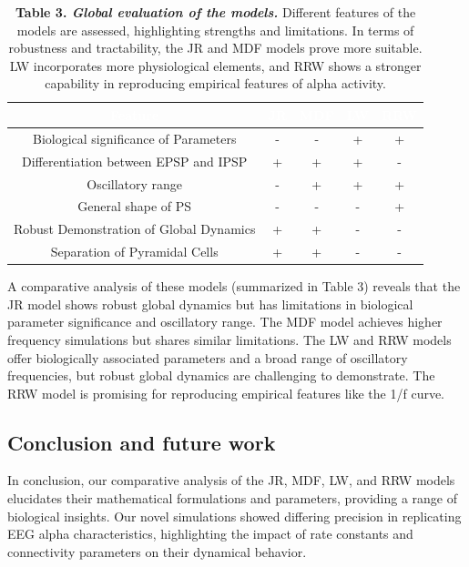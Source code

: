 \documentclass[12pt,twoside]{article}
\begin{document}
\begin{table}
    \scriptsize
    \centering
    \begin{tabular}{ccccc}
        \rowcolor{black} 
        \textcolor{white}{Feature} & \textcolor{white}{JR} & \textcolor{white}{MDF} & \textcolor{white}{LW} & \textcolor{white}{RRW} \\
        \hline
        Biological significance of Parameters & - & - & + & + \\
        Differentiation between EPSP and IPSP & + & + & + & - \\
        Oscillatory range & - & + & + & + \\
        General shape of PS & - & - & - & + \\
        Robust Demonstration of Global Dynamics & + & + & - & - \\
        Separation of Pyramidal Cells & + & + & - & -
    \end{tabular}
    \caption*{\textbf{Table 3. \textit{Global evaluation of the models.}} Different features of the models are assessed, highlighting strengths and limitations. In terms of robustness and tractability, the JR and MDF models prove more suitable. LW incorporates more physiological elements, and RRW shows a stronger capability in reproducing empirical features of alpha activity.} 
    \label{tab:global_eval}
    \vspace{-0.5cm}
\end{table}

A comparative analysis of these models (summarized in Table 3) reveals that the JR model shows robust global dynamics but has limitations in biological parameter significance and oscillatory range. The MDF model achieves higher frequency simulations but shares similar limitations. The LW and RRW models offer biologically associated parameters and a broad range of oscillatory frequencies, but robust global dynamics are challenging to demonstrate. The RRW model is promising for reproducing empirical features like the 1/f curve.


\subsection{Conclusion and future work}

In conclusion, our comparative analysis of the JR, MDF, LW, and RRW models elucidates their mathematical formulations and parameters, providing a range of biological insights. Our novel simulations showed differing precision in replicating EEG alpha characteristics, highlighting the impact of rate constants and connectivity parameters on their dynamical behavior.
\end{document}
